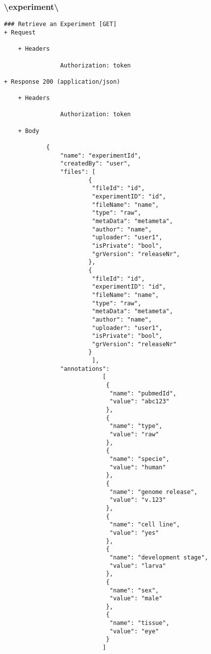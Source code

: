 \subsubsection*{\textbackslash experiment\textbackslash <experiment-id>}
\begin{verbatim}
### Retrieve an Experiment [GET]
+ Request 

    + Headers
    
                Authorization: token
                
+ Response 200 (application/json)

    + Headers
    
                Authorization: token
       
    + Body 
    
            {
                "name": "experimentId",
                "createdBy": "user",
                "files": [
                        { 
                         "fileId": "id",
                         "experimentID": "id",
                         "fileName": "name",
                         "type": "raw",
                         "metaData": "metameta",
                         "author": "name",
                         "uploader": "user1",
                         "isPrivate": "bool",
                         "grVersion": "releaseNr",
                        },
                        { 
                         "fileId": "id",
                         "experimentID": "id",
                         "fileName": "name",
                         "type": "raw",
                         "metaData": "metameta",
                         "author": "name",
                         "uploader": "user1",
                         "isPrivate": "bool",
                         "grVersion": "releaseNr"
                        }
                         ],
                "annotations": 
                            [
                             {
                              "name": "pubmedId",
                              "value": "abc123"
                             }, 
                             {
                              "name": "type",
                              "value": "raw"
                             },
                             {
                              "name": "specie",
                              "value": "human"
                             },
                             {
                              "name": "genome release",
                              "value": "v.123"
                             },
                             {
                              "name": "cell line",
                              "value": "yes"
                             },
                             {
                              "name": "development stage",
                              "value": "larva"
                             },
                             {
                              "name": "sex",
                              "value": "male"
                             },
                             {
                              "name": "tissue",
                              "value": "eye"
                             }
                            ]
                

\end{verbatim}
